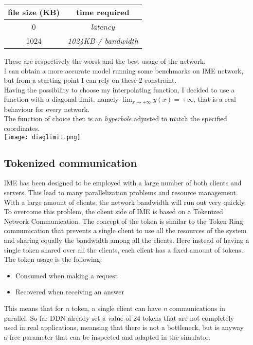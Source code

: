 \vspace{0.5cm}
\begin{tabular}{c | c}
    file size (KB) & time required \\ \hline
    0 & \textit{latency} \\ \hline
    1024 & \textit{1024KB / bandwidth}
\end{tabular}
\vspace{0.5cm}

These are respectively the worst and the best usage of the network. \\
I can obtain a more accurate model running some benchmarks on IME network, but
from a starting point I can rely on these 2 constraint. \\
Having the possibility to choose my interpolating function, I decided to use a
function with a diagonal limit, namely $\lim_{x \to +\infty} y(x) = +\infty$,
that is a real behaviour for every network. \\
The function of choice then is an \textit{hyperbole} adjusted to match the
specified coordinates. \\
\texttt{[image: diaglimit.png]}


\subsection{Tokenized communication}
IME has been designed to be employed with a large number of both clients and
servers. This lead to many parallelization problems and resource management.
With a large amount of clients, the network bandwidth will run out very quickly.
To overcome this problem, the client side of IME is based on a Tokenized Network
Communication. The concept of the token is similar to the Token Ring
communication \cite{token-ring} that prevents a single client to use all the
resources of the system and sharing equally the bandwidth among all the
clients.  Here instead of having a single token shared over all the clients,
each client has a fixed amount of tokens.\\
The token usage is the following:
\begin{itemize}
    \item Consumed when making a request
    \item Recovered when receiving an answer
\end{itemize}
This means that for \textit{n} token, a single client can have \textit{n}
communications in parallel.  So far DDN already set a value of 24 tokens that
are not completely used in real applications, meansing that there is not a
bottleneck, but is anyway a free parameter that can be inspected and adapted in
the simulator.


